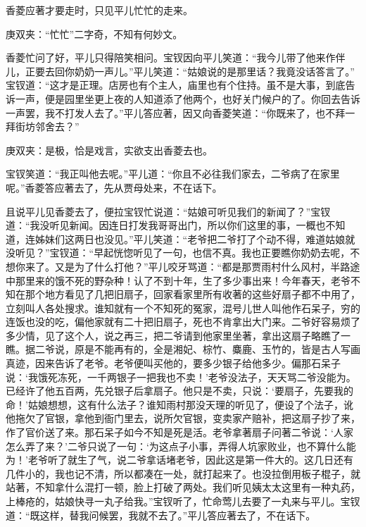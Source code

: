 \begin{parag}
    香菱应著才要走时，只见平儿忙忙的走来。\begin{note}庚双夹：“忙忙”二字奇，不知有何妙文。\end{note}香菱忙问了好，平儿只得陪笑相问。宝钗因向平儿笑道：“我今儿带了他来作伴儿，正要去回你奶奶一声儿。”平儿笑道：“姑娘说的是那里话？我竟没话答言了。” 宝钗道：“这才是正理。店房也有个主人，庙里也有个住持。虽不是大事，到底告诉一声，便是园里坐更上夜的人知道添了他两个，也好关门候户的了。你回去告诉一声罢，我不打发人去了。”平儿答应著，因又向香菱笑道：“你既来了，也不拜一拜街坊邻舍去？”\begin{note}庚双夹：是极，恰是戏言，实欲支出香菱去也。\end{note}宝钗笑道：“我正叫他去呢。”平儿道：“你且不必往我们家去，二爷病了在家里呢。”香菱答应著去了，先从贾母处来，不在话下。
\end{parag}


\begin{parag}
    且说平儿见香菱去了，便拉宝钗忙说道：“姑娘可听见我们的新闻了？”宝钗道：“我没听见新闻。因连日打发我哥哥出门，所以你们这里的事，一概也不知道，连姊妹们这两日也没见。”平儿笑道：“老爷把二爷打了个动不得，难道姑娘就没听见？”宝钗道：“早起恍惚听见了一句，也信不真。我也正要瞧你奶奶去呢，不想你来了。又是为了什么打他？”平儿咬牙骂道：“都是那贾雨村什么风村，半路途中那里来的饿不死的野杂种！认了不到十年，生了多少事出来！今年春天，老爷不知在那个地方看见了几把旧扇子，回家看家里所有收著的这些好扇子都不中用了，立刻叫人各处搜求。谁知就有一个不知死的冤家，混号儿世人叫他作石呆子，穷的连饭也没的吃，偏他家就有二十把旧扇子，死也不肯拿出大门来。二爷好容易烦了多少情，见了这个人，说之再三，把二爷请到他家里坐著，拿出这扇子略瞧了一瞧。据二爷说，原是不能再有的，全是湘妃、棕竹、麋鹿、玉竹的，皆是古人写画真迹，因来告诉了老爷。老爷便叫买他的，要多少银子给他多少。偏那石呆子说：‘我饿死冻死，一千两银子一把我也不卖！’老爷没法子，天天骂二爷没能为。已经许了他五百两，先兑银子后拿扇子。他只是不卖，只说：‘要扇子，先要我的命！’姑娘想想，这有什么法子？谁知雨村那没天理的听见了，便设了个法子，讹他拖欠了官银，拿他到衙门里去，说所欠官银，变卖家产赔补，把这扇子抄了来，作了官价送了来。那石呆子如今不知是死是活。老爷拿著扇子问著二爷说：‘人家怎么弄了来？’二爷只说了一句：‘为这点子小事，弄得人坑家败业，也不算什么能为！’老爷听了就生了气，说二爷拿话堵老爷，因此这是第一件大的。这几日还有几件小的，我也记不清，所以都凑在一处，就打起来了。也没拉倒用板子棍子，就站著，不知拿什么混打一顿，脸上打破了两处。我们听见姨太太这里有一种丸药，上棒疮的，姑娘快寻一丸子给我。”宝钗听了，忙命莺儿去要了一丸来与平儿。宝钗道：“既这样，替我问候罢，我就不去了。”平儿答应著去了，不在话下。
\end{parag}



